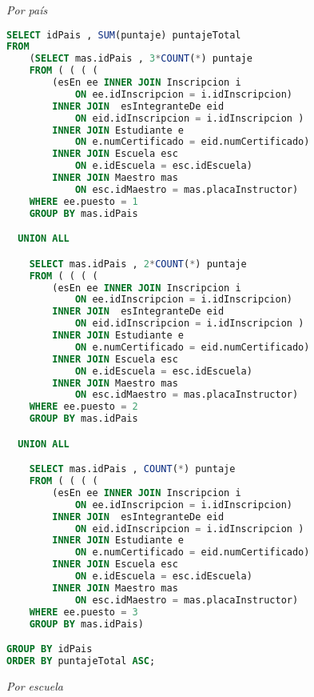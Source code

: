 \indent\emph{Por país}
\begin{lstlisting}[language=SQL]
SELECT idPais , SUM(puntaje) puntajeTotal
FROM
    (SELECT mas.idPais , 3*COUNT(*) puntaje
    FROM ( ( ( (
        (esEn ee INNER JOIN Inscripcion i
            ON ee.idInscripcion = i.idInscripcion)
        INNER JOIN  esIntegranteDe eid
            ON eid.idInscripcion = i.idInscripcion )
        INNER JOIN Estudiante e
            ON e.numCertificado = eid.numCertificado)
        INNER JOIN Escuela esc
            ON e.idEscuela = esc.idEscuela)
        INNER JOIN Maestro mas
            ON esc.idMaestro = mas.placaInstructor)
    WHERE ee.puesto = 1
    GROUP BY mas.idPais

  UNION ALL

    SELECT mas.idPais , 2*COUNT(*) puntaje
    FROM ( ( ( (
        (esEn ee INNER JOIN Inscripcion i
            ON ee.idInscripcion = i.idInscripcion)
        INNER JOIN  esIntegranteDe eid
            ON eid.idInscripcion = i.idInscripcion )
        INNER JOIN Estudiante e
            ON e.numCertificado = eid.numCertificado)
        INNER JOIN Escuela esc
            ON e.idEscuela = esc.idEscuela)
        INNER JOIN Maestro mas
            ON esc.idMaestro = mas.placaInstructor)
    WHERE ee.puesto = 2
    GROUP BY mas.idPais

  UNION ALL

    SELECT mas.idPais , COUNT(*) puntaje
    FROM ( ( ( (
        (esEn ee INNER JOIN Inscripcion i
            ON ee.idInscripcion = i.idInscripcion)
        INNER JOIN  esIntegranteDe eid
            ON eid.idInscripcion = i.idInscripcion )
        INNER JOIN Estudiante e
            ON e.numCertificado = eid.numCertificado)
        INNER JOIN Escuela esc
            ON e.idEscuela = esc.idEscuela)
        INNER JOIN Maestro mas
            ON esc.idMaestro = mas.placaInstructor)
    WHERE ee.puesto = 3
    GROUP BY mas.idPais)

GROUP BY idPais
ORDER BY puntajeTotal ASC;
\end{lstlisting}

\indent\emph{Por escuela}

